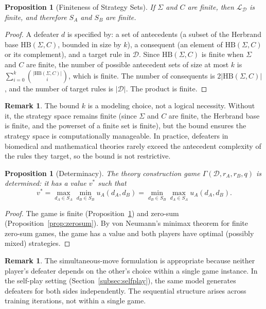 \documentclass{article}
\newtheorem{proposition}[theorem]{Proposition}
\theoremstyle{definition}
\newtheorem{remark}[theorem]{Remark}
\newcommand{\D}{\mathcal{D}}
\begin{document}
\begin{proposition}[Finiteness of Strategy Sets]\label{prop:finiteness}
If $\Sigma$ and $C$ are finite, then $\mathcal{L}_\D$ is finite, and therefore $S_A$ and $S_B$ are finite.
\end{proposition}

\begin{proof}
A defeater $d$ is specified by: a set of antecedents (a subset of the Herbrand base $\mathrm{HB}(\Sigma, C)$, bounded in size by $k$), a consequent (an element of $\mathrm{HB}(\Sigma, C)$ or its complement), and a target rule in $\D$. Since $\mathrm{HB}(\Sigma, C)$ is finite when $\Sigma$ and $C$ are finite, the number of possible antecedent sets of size at most $k$ is $\sum_{i=0}^{k} \binom{|\mathrm{HB}(\Sigma, C)|}{i}$, which is finite. The number of consequents is $2|\mathrm{HB}(\Sigma, C)|$, and the number of target rules is $|\D|$. The product is finite.
\end{proof}

\begin{remark}\label{rem:finiteness}
The bound $k$ is a modeling choice, not a logical necessity. Without it, the strategy space remains finite (since $\Sigma$ and $C$ are finite, the Herbrand base is finite, and the powerset of a finite set is finite), but the bound ensures the strategy space is computationally manageable. In practice, defeaters in biomedical and mathematical theories rarely exceed the antecedent complexity of the rules they target, so the bound is not restrictive.
\end{remark}

\begin{proposition}[Determinacy]\label{prop:determinacy}
The theory construction game $\Gamma(\D, r_A, r_B, q)$ is determined: it has a value $v^*$ such that
\[
    v^* = \max_{d_A \in S_A} \min_{d_B \in S_B} u_A(d_A, d_B) = \min_{d_B \in S_B} \max_{d_A \in S_A} u_A(d_A, d_B).
\]
\end{proposition}

\begin{proof}
The game is finite (Proposition~\ref{prop:finiteness}) and zero-sum (Proposition~\ref{prop:zerosum}). By von Neumann's minimax theorem for finite zero-sum games, the game has a value and both players have optimal (possibly mixed) strategies.
\end{proof}

\begin{remark}\label{rem:simultaneous}
The simultaneous-move formulation is appropriate because neither player's defeater depends on the other's choice within a single game instance. In the self-play setting (Section~\ref{subsec:selfplay}), the same model generates defeaters for both sides independently. The sequential structure arises across training iterations, not within a single game.
\end{remark}
\end{document}
